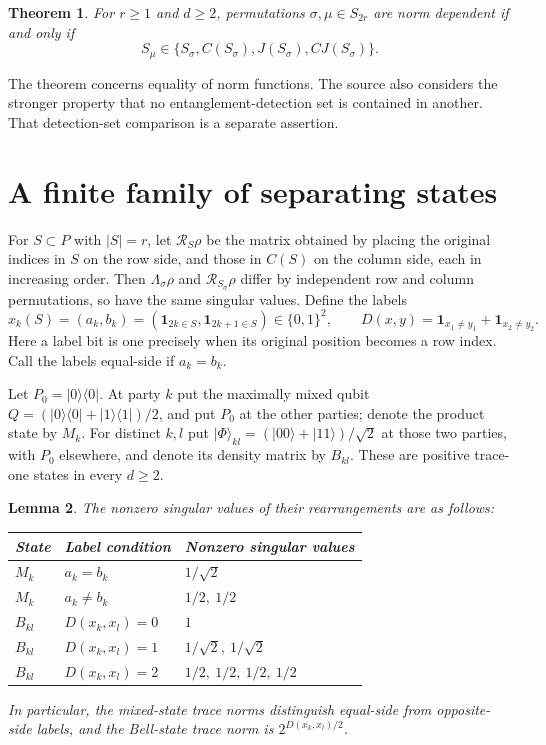 \documentclass[11pt]{article}
\newtheorem{theorem}{Theorem}
\newtheorem{lemma}[theorem]{Lemma}
\newcommand{\ket}[1]{\lvert #1\rangle}
\newcommand{\bra}[1]{\langle #1\rvert}
\newcommand{\bits}{\{0,1\}}
\newcommand{\R}{\mathcal R}
\begin{document}
\begin{theorem}\label{thm:main}
For $r\geq1$ and $d\geq2$, permutations $\sigma,\mu\in S_{2r}$ are
norm dependent if and only if
\begin{equation}\label{eq:orbit}
 S_\mu\in\{S_\sigma,C(S_\sigma),J(S_\sigma),CJ(S_\sigma)\}.
\end{equation}
\end{theorem}

The theorem concerns equality of norm functions. The source also considers
the stronger property that no entanglement-detection set is contained in
another. That detection-set comparison is a separate assertion.

\section{A finite family of separating states}

For $S\subset P$ with $|S|=r$, let $\R_S\rho$ be the matrix obtained by
placing the original indices in $S$ on the row side, and those in $C(S)$
on the column side, each in increasing order. Then $\Lambda_\sigma\rho$
and $\R_{S_\sigma}\rho$ differ by independent row and column permutations,
so have the same singular values. Define the labels
\[
 x_k(S)=(a_k,b_k)
   =(\mathbf1_{2k\in S},\mathbf1_{2k+1\in S})\in\bits^2,
 \qquad
 D(x,y)=\mathbf1_{x_1\ne y_1}+\mathbf1_{x_2\ne y_2}.
\]
Here a label bit is one precisely when its original position becomes a
row index. Call the labels equal-side if $a_k=b_k$.

Let $P_0=\ket0\bra0$. At party $k$ put the maximally mixed qubit
$Q=(\ket0\bra0+\ket1\bra1)/2$, and put $P_0$ at the other parties;
denote the product state by $M_k$. For distinct $k,l$ put
$\ket{\Phi}_{kl}=(\ket{00}+\ket{11})/\sqrt2$ at those two parties,
with $P_0$ elsewhere, and denote its density matrix by $B_{kl}$.
These are positive trace-one states in every $d\geq2$.

\begin{lemma}\label{lem:norms}
The nonzero singular values of their rearrangements are as follows:
\begin{center}
\begin{tabular}{lll}
\toprule
State & Label condition & Nonzero singular values\\
\midrule
$M_k$ & $a_k=b_k$ & $1/\sqrt2$\\
$M_k$ & $a_k\ne b_k$ & $1/2,\ 1/2$\\
$B_{kl}$ & $D(x_k,x_l)=0$ & $1$\\
$B_{kl}$ & $D(x_k,x_l)=1$ & $1/\sqrt2,\ 1/\sqrt2$\\
$B_{kl}$ & $D(x_k,x_l)=2$ & $1/2,\ 1/2,\ 1/2,\ 1/2$\\
\bottomrule
\end{tabular}
\end{center}
In particular, the mixed-state trace norms distinguish equal-side from
opposite-side labels, and the Bell-state trace norm is $2^{D(x_k,x_l)/2}$.
\end{lemma}
\end{document}
